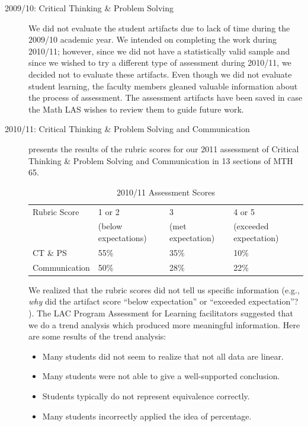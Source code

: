 \begin{description}
	\item[2009/10: Critical Thinking \& Problem Solving]
	      We did not evaluate the student artifacts due to lack of time during the 2009/10
	      academic year.
	      We intended on completing the work during 2010/11; however, since we did not have a statistically valid sample and since we wished to try a different type of assessment during 2010/11, we decided not to evaluate these artifacts.
	      Even though we did not evaluate student learning, the faculty members gleaned valuable information about the process of assessment.
	      The assessment artifacts have been saved in case the Math LAS wishes to review them to guide future work.
	\item[2010/11:  Critical Thinking \& Problem Solving and Communication]
	       presents the results of the rubric scores for our
	      2011 assessment of Critical Thinking \& Problem Solving and Communication in 13
	      sections of MTH 65.
	      \begin{table}[!htb]
		      \centering
		      \caption{2010/11 Assessment Scores}\label{ass:tab:201011scores}
		      \begin{tabularx}{\linewidth}{Xlll}
			      \toprule
			      Rubric Score  & 1 or 2               & 3                 & 4 or 5                 \\
			                    & (below expectations) & (met expectation) & (exceeded expectation) \\
			      \midrule
			      CT \& PS      & 55\%                 & 35\%              & 10\%                   \\
			      Communication & 50\%                 & 28\%              & 22\%                   \\
			      \bottomrule
		      \end{tabularx}
	      \end{table}

	      We realized that the rubric scores did not tell us specific information (e.g., \emph{why} did the artifact score ``below expectation'' or ``exceeded expectation''?
	      ).
	      The LAC Program Assessment for Learning  facilitators suggested that we do a trend analysis which produced more meaningful information.
	      Here are some results of the trend analysis:
	      \begin{itemize}
		      \item Many students did not seem to realize that not all data are linear.
		      \item Many students were not able to give a well-supported conclusion.
		      \item Students typically do not represent equivalence correctly.
		      \item Many students incorrectly applied the idea of percentage.
	      \end{itemize}


\end{description}
